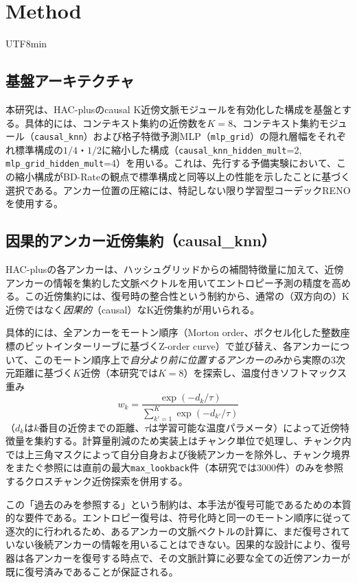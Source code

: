 \documentclass{ieeeaccess}
\begin{document}
\section{Method}
\begin{CJK}{UTF8}{min}

\subsection{基盤アーキテクチャ}
本研究は、HAC-plusのcausal K近傍文脈モジュールを有効化した構成を基盤とする。具体的には、コンテキスト集約の近傍数を$K=8$、コンテキスト集約モジュール（\texttt{causal\_knn}）および格子特徴予測MLP（\texttt{mlp\_grid}）の隠れ層幅をそれぞれ標準構成の$1/4$・$1/2$に縮小した構成（\texttt{causal\_knn\_hidden\_mult}=2, \texttt{mlp\_grid\_hidden\_mult}=4）を用いる。これは、先行する予備実験において、この縮小構成がBD-Rateの観点で標準構成と同等以上の性能を示したことに基づく選択である。アンカー位置の圧縮には、特記しない限り学習型コーデックRENOを使用する。

\subsection{因果的アンカー近傍集約（causal\_knn）}
\label{sec:causal-knn}
HAC-plusの各アンカーは、ハッシュグリッドからの補間特徴量に加えて、近傍アンカーの情報を集約した文脈ベクトルを用いてエントロピー予測の精度を高める。この近傍集約には、復号時の整合性という制約から、通常の（双方向の）K近傍ではなく\emph{因果的}（causal）なK近傍集約が用いられる。

具体的には、全アンカーをモートン順序（Morton order、ボクセル化した整数座標のビットインターリーブに基づくZ-order curve）で並び替え、各アンカーについて、このモートン順序上で\emph{自分より前に位置するアンカーのみ}から実際の3次元距離に基づく$K$近傍（本研究では$K=8$）を探索し、温度付きソフトマックス重み
\begin{equation}
w_k = \frac{\exp(-d_k / \tau)}{\sum_{k'=1}^{K} \exp(-d_{k'} / \tau)}
\end{equation}
（$d_k$は$k$番目の近傍までの距離、$\tau$は学習可能な温度パラメータ）によって近傍特徴量を集約する。計算量削減のため実装上はチャンク単位で処理し、チャンク内では上三角マスクによって自分自身および後続アンカーを除外し、チャンク境界をまたぐ参照には直前の最大\texttt{max\_lookback}件（本研究では3000件）のみを参照するクロスチャンク近傍探索を併用する。

この「過去のみを参照する」という制約は、本手法が復号可能であるための本質的な要件である。エントロピー復号は、符号化時と同一のモートン順序に従って逐次的に行われるため、あるアンカーの文脈ベクトルの計算に、まだ復号されていない後続アンカーの情報を用いることはできない。因果的な設計により、復号器は各アンカーを復号する時点で、その文脈計算に必要な全ての近傍アンカーが既に復号済みであることが保証される。


\end{CJK}
\end{document}
